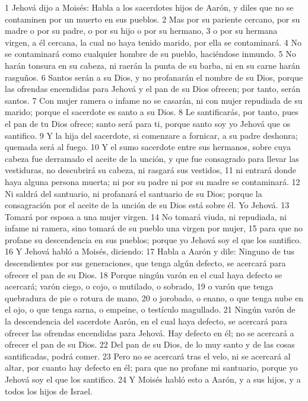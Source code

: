 1 Jehová dijo a Moisés: Habla a los sacerdotes hijos de Aarón, y diles que no se contaminen por un muerto en sus pueblos.
2 Mas por su pariente cercano, por su madre o por su padre, o por su hijo o por su hermano,
3 o por su hermana virgen, a él cercana, la cual no haya tenido marido, por ella se contaminará.
4 No se contaminará como cualquier hombre de su pueblo, haciéndose inmundo.
5 No harán tonsura en su cabeza, ni raerán la punta de su barba, ni en su carne harán rasguños.
6 Santos serán a su Dios, y no profanarán el nombre de su Dios, porque las ofrendas encendidas para Jehová y el pan de su Dios ofrecen; por tanto, serán santos.
7 Con mujer ramera o infame no se casarán, ni con mujer repudiada de su marido; porque el sacerdote es santo a su Dios.
8 Le santificarás, por tanto, pues el pan de tu Dios ofrece; santo será para ti, porque santo soy yo Jehová que os santifico.
9 Y la hija del sacerdote, si comenzare a fornicar, a su padre deshonra; quemada será al fuego.
10 Y el sumo sacerdote entre sus hermanos, sobre cuya cabeza fue derramado el aceite de la unción, y que fue consagrado para llevar las vestiduras, no descubrirá su cabeza, ni rasgará sus vestidos,
11 ni entrará donde haya alguna persona muerta; ni por su padre ni por su madre se contaminará.
12 Ni saldrá del santuario, ni profanará el santuario de su Dios; porque la consagración por el aceite de la unción de su Dios está sobre él. Yo Jehová.
13 Tomará por esposa a una mujer virgen.
14 No tomará viuda, ni repudiada, ni infame ni ramera, sino tomará de su pueblo una virgen por mujer,
15 para que no profane su descendencia en sus pueblos; porque yo Jehová soy el que los santifico.
16 Y Jehová habló a Moisés, diciendo:
17 Habla a Aarón y dile: Ninguno de tus descendientes por sus generaciones, que tenga algún defecto, se acercará para ofrecer el pan de su Dios.
18 Porque ningún varón en el cual haya defecto se acercará; varón ciego, o cojo, o mutilado, o sobrado,
19 o varón que tenga quebradura de pie o rotura de mano,
20 o jorobado, o enano, o que tenga nube en el ojo, o que tenga sarna, o empeine, o testículo magullado.
21 Ningún varón de la descendencia del sacerdote Aarón, en el cual haya defecto, se acercará para ofrecer las ofrendas encendidas para Jehová. Hay defecto en él; no se acercará a ofrecer el pan de su Dios.
22 Del pan de su Dios, de lo muy santo y de las cosas santificadas, podrá comer.
23 Pero no se acercará tras el velo, ni se acercará al altar, por cuanto hay defecto en él; para que no profane mi santuario, porque yo Jehová soy el que los santifico.
24 Y Moisés habló esto a Aarón, y a sus hijos, y a todos los hijos de Israel.

